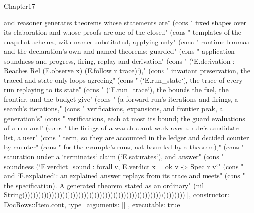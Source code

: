 \begin{lexlean}{Chapter17}
\begin{semanticmodule}
{{and reasoner generates theorems whose statements are" (cons "    fixed shapes over its elaboration and whose proofs are one of the closed" (cons "    templates of the snapshot schema, with names substituted, applying only" (cons "    runtime lemmas and the declaration's own and named theorems: guarded" (cons "    application soundness and progress, firing, replay and derivation" (cons "    (`E.derivation : Reaches Rel (E.observe x) (E.follow x trace)`)," (cons "    invariant preservation, the traced and state-only loops agreeing" (cons "    (`E.run_state`), the trace of every run replaying to its state" (cons "    (`E.run_trace`), the bounds the fuel, the frontier, and the budget give" (cons "    (a forward run's iterations and firings, a search's iterations," (cons "    verifications, expansions, and frontier peak, a generation's" (cons "    verifications, each at most its bound; the guard evaluations of a run and" (cons "    the firings of a search count work over a rule's candidate list, a user" (cons "    term, so they are accounted in the ledger and decided counter by counter" (cons "    for the example's runs, not bounded by a theorem)," (cons "    saturation under a `terminates` claim (`E.saturates`), and answer" (cons "    soundness (`E.verdict_sound : forall v, E.verdict x = ok v -> Spec x v`" (cons "    and `E.explained`: an explained answer replays from its trace and meets" (cons "    the specification). A generated theorem stated as an ordinary" (nil String)))))))))))))))))))))))))))))))))))))))))))))))))))))))))))))
    ],
    constructor: DocRows::Item.cont,
    type_arguments: []
  },
  executable: true
}


\end{semanticmodule}
\end{lexlean}
